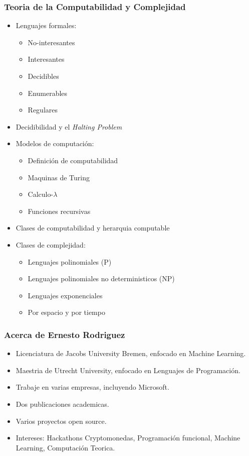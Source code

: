 \documentclass{beamer}
\begin{document}
\begin{frame}
\frametitle{Teoria de la Computabilidad y Complejidad}
\begin{itemize}
    \item{Lenguajes formales:
    \begin{itemize}
        \item{No-interesantes}
        \item{Interesantes}
        \item{Decidibles}
        \item{Enumerables}
        \item{Regulares}
    \end{itemize}
    }
    \item{Decidibilidad y el \emph{Halting Problem}}
    \item{Modelos de computaci\'on:
    \begin{itemize}
        \item{Definici\'on de computabilidad}
        \item{Maquinas de Turing}
        \item{Calculo-$\lambda$}
        \item{Funciones recursivas}
    \end{itemize}
    }
    \item{Clases de computabilidad y herarquia computable}
    \item{Clases de complejidad:
    \begin{itemize}
        \item{Lenguajes polinomiales (P)}
        \item{Lenguajes polinomiales no deterministicos (NP)}
        \item{Lenguajes exponenciales}
        \item{Por espacio y por tiempo}
    \end{itemize}
    }
\end{itemize}
\end{frame}

\begin{frame}
\frametitle{Acerca de Ernesto Rodriguez}
\begin{itemize}
    \item{Licenciatura de Jacobs University Bremen,
    enfocado en Machine Learning.}
    \item{Maestria de Utrecht University, enfocado
    en Lenguajes de Programaci\'on.}
    \item{Trabaje en varias empresas, incluyendo Microsoft.}
    \item{Dos publicaciones academicas.}
    \item{Varios proyectos open source.}
    \item{Intereses: Hackathons Cryptomonedas, Programaci\'on funcional,
    Machine Learning, Computaci\'on Teorica.}
\end{itemize}
\end{frame}
\end{document}
